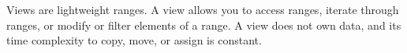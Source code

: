 Views are lightweight ranges. A view allows you to access ranges, iterate through ranges, or modify or filter elements of a range. A view does not own data, and its time complexity to copy, move, or assign is constant.